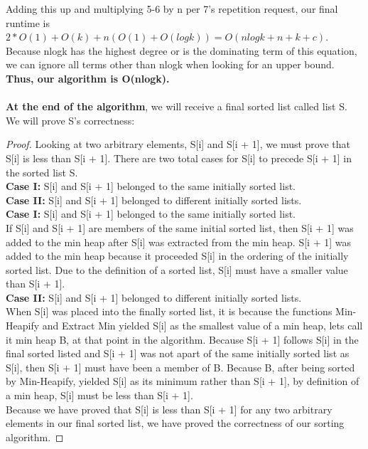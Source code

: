 \documentclass[11pt, solution, letterpaper]{format}
\begin{document}
Adding this up and multiplying 5-6 by n per 7's repetition request, our final runtime is $2*O(1) + O(k) + n(O(1) + O(logk)) = O(nlogk + n + k + c)$. Because nlogk has the highest degree or is the dominating term of this equation, we can ignore all terms other than nlogk when looking for an upper bound. \\\textbf{Thus, our algorithm is O(nlogk).} \\\\


\textbf{At the end of the algorithm}, we will receive a final sorted list called list S. We will prove S's correctness: \\
\begin{proof} Looking at two arbitrary elements, S[i] and S[i + 1], we must prove that S[i] is less than S[i + 1]. There are two total cases for S[i] to precede S[i + 1] in the sorted list S.\\
\textbf{Case I:} S[i] and S[i + 1] belonged to the same initially sorted list.\\
\textbf{Case II:} S[i] and S[i + 1] belonged to different initially sorted lists. \\


\textbf{Case I:} S[i] and S[i + 1] belonged to the same initially sorted list.\\
If S[i] and S[i + 1] are members of the same initial sorted list, then S[i + 1] was added to the min heap after S[i] was extracted from the min heap. S[i + 1] was added to the min heap because it proceeded S[i] in the ordering of the initially sorted list. Due to the definition of a sorted list, S[i] must have a smaller value than S[i + 1].\\

\textbf{Case II:} S[i] and S[i + 1] belonged to different initially sorted lists. \\
When S[i] was placed into the finally sorted list, it is because the functions Min-Heapify and Extract Min yielded S[i] as the smallest value of a min heap, lets call it min heap B, at that point in the algorithm. Because S[i + 1] follows S[i] in the final sorted listed and S[i + 1] was not apart of the same initially sorted list as S[i], then S[i + 1] must have been a member of B. Because B, after being sorted by Min-Heapify, yielded S[i] as its minimum rather than S[i + 1], by definition of a min heap, S[i] must be less than S[i + 1].\\


Because we have proved that S[i] is less than S[i + 1] for any two arbitrary elements in our final sorted list, we have proved the correctness of our sorting algorithm.\end{proof}
    
\end{document}
